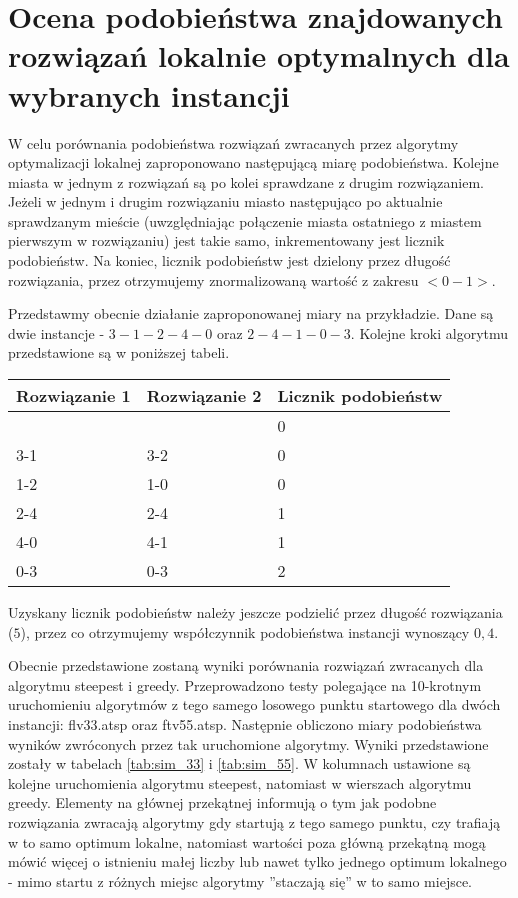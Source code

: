 \section{Ocena podobieństwa znajdowanych rozwiązań lokalnie optymalnych dla wybranych instancji}
W celu porównania podobieństwa rozwiązań zwracanych przez algorytmy optymalizacji lokalnej zaproponowano następującą miarę podobieństwa. Kolejne miasta w jednym z rozwiązań są po kolei sprawdzane z drugim rozwiązaniem. Jeżeli w jednym i drugim rozwiązaniu miasto następująco po aktualnie sprawdzanym mieście (uwzględniając połączenie miasta ostatniego z miastem pierwszym w rozwiązaniu) jest takie samo, inkrementowany jest licznik podobieństw. Na koniec, licznik podobieństw jest dzielony przez długość rozwiązania, przez otrzymujemy znormalizowaną wartość z zakresu $<0-1>$.

Przedstawmy obecnie działanie zaproponowanej miary na przykładzie. Dane są dwie instancje - $3-1-2-4-0$ oraz $2-4-1-0-3$. Kolejne kroki algorytmu przedstawione są w poniższej tabeli.

\begin{tabular}{|l|l|l|}
		\hline
		Rozwiązanie 1 & Rozwiązanie 2 & Licznik podobieństw\\
		\hline
		& & 0 \\
		3-1 & 3-2 & 0 \\
		1-2 & 1-0 & 0 \\
		2-4 & 2-4 & 1 \\
		4-0 & 4-1 & 1 \\
		0-3 & 0-3 & 2\\
		\hline
\end{tabular}

\noindent Uzyskany licznik podobieństw należy jeszcze podzielić przez długość rozwiązania ($5$), przez co otrzymujemy współczynnik podobieństwa instancji wynoszący $0,4$.

Obecnie przedstawione zostaną wyniki porównania rozwiązań zwracanych dla algorytmu steepest i greedy. Przeprowadzono testy polegające na 10-krotnym uruchomieniu algorytmów z tego samego losowego punktu startowego dla dwóch instancji: flv33.atsp oraz ftv55.atsp. Następnie obliczono miary podobieństwa wyników zwróconych przez tak uruchomione algorytmy. Wyniki przedstawione zostały w tabelach \ref{tab:sim_33} i \ref{tab:sim_55}. W kolumnach ustawione są kolejne uruchomienia algorytmu steepest, natomiast w wierszach algorytmu greedy. Elementy na głównej przekątnej informują o tym jak podobne rozwiązania zwracają algorytmy gdy startują z tego samego punktu, czy trafiają w to samo optimum lokalne, natomiast wartości poza główną przekątną mogą mówić więcej o istnieniu małej liczby lub nawet tylko jednego optimum lokalnego - mimo startu z różnych miejsc algorytmy ''staczają się'' w to samo miejsce.

